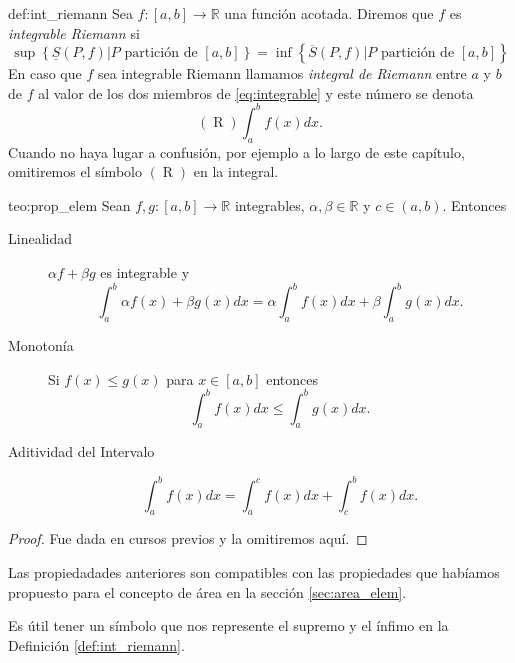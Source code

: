 \begin{definicion}{def:int_riemann} Sea $f:[a,b]\to\mathbb{R}$ una función acotada. Diremos que $f$ es {\em integrable Riemann}  si 
\begin{equation}\label{eq:integrable}
 \sup\left\{\underline{S}(P,f)| P \text{ partición de }[a,b]\right\}=\inf\left\{\overline{S}(P,f)| P \text{ partición de }[a,b]\right\}
\end{equation}
En caso que $f$ sea integrable Riemann llamamos {\em integral de Riemann}  entre $a$ y $b$ de $f$ al valor de los dos miembros de \eqref{eq:integrable} y este número se denota
\[
(\mathop{R})\int_a^bf(x)dx. 
\]
Cuando no haya lugar a confusión, por ejemplo a lo largo de este capítulo, omitiremos el símbolo $(\mathop{R})$ en la integral.
\end{definicion}



\begin{teorema}{teo:prop_elem} Sean $f,g:[a,b]\to\mathbb{R}$ integrables, $\alpha,\beta\in\mathbb{R}$ y $c\in (a,b)$. Entonces
\begin{description}
 \item[Linealidad] $\alpha f+\beta g$ es integrable y 
 \[
  \int_a^b\alpha f(x)+\beta g(x)dx=\alpha \int_a^bf(x)dx+\beta\int_a^b g(x)dx.
 \]
 \item[Monotonía] Si $f(x)\leq g(x)$  para $x\in [a,b]$ entonces 
 \[
  \int_a^b f(x)dx\leq \int_a^b g(x)dx.
 \]
 \item[Aditividad del Intervalo]  \[
  \int_a^b  f(x)dx= \int_a^cf(x)dx+\int_c^b f(x)dx.
 \]
\end{description}


\end{teorema}

\begin{proof} Fue dada en cursos previos y la omitiremos aquí. 
\end{proof}


\begin{observa} Las propiedadades anteriores son compatibles con las propiedades que habíamos propuesto para el concepto de área en la sección  \ref{sec:area_elem}.
\end{observa}



Es útil tener un símbolo que nos represente el supremo y el ínfimo en la Definición \ref{def:int_riemann}.

